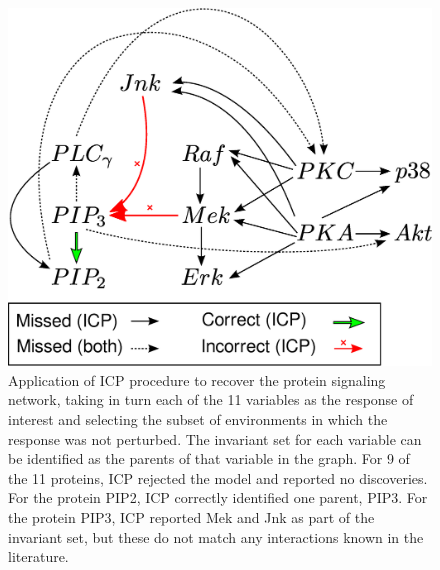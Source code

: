 \documentclass{article}
\begin{document}
\begin{figure}[t]
\centering
\includegraphics[scale = 0.3]{drawing2legend.eps}
\caption{\small Application of ICP procedure to recover the protein signaling network,
taking in turn each of the 11 variables as the response of interest
and selecting the subset of environments in which the response was not
perturbed.  The invariant set for each variable can be identified as
the parents of that variable in the graph.  For 9 of the 11 proteins,
ICP rejected the model and reported no discoveries.  For the protein
PIP2, ICP correctly identified one parent, PIP3.  For the protein
PIP3, ICP reported Mek and Jnk as part of the invariant set, but these
do not match any interactions known in the literature.}
\label{fig:sachs}
\end{figure}




\end{document}
